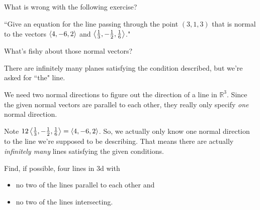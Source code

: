 


\subsection*{\Conceptual}
\begin{question}
What is wrong with the following exercise?

``Give an equation for the line passing through the point $(3,1,3)$ that is normal to the vectors $\left< 4,-6,2 \right>$ and $\left< \frac13,-\frac12,\frac16 \right>$."
\end{question}
\begin{hint}
What's fishy about those normal vectors? 
\end{hint}
\begin{answer}
There are infinitely many planes satisfying the condition described, but we're asked for ``the" line.

We need two normal directions to figure out the direction of a line in $\mathbb R^3$. Since the given normal vectors are parallel to each other, they really only specify \emph{one} normal direction. 
\end{answer}
\begin{solution}
Note $12\left< \frac13,-\frac12,\frac16 \right>=\left< 4,-6,2 \right>$. So, we actually only know one normal direction to the line we're supposed to be describing. That means there are actually \emph{infinitely many} lines satisfying the given conditions.

\begin{center}
\end{center}

\end{solution}

\begin{question}
Find, if possible, four lines in 3d with
\begin{itemize}
\item
   no two of the lines parallel to each other and
\item
   no two of the lines intersecting.
\end{itemize}
\end{question}

